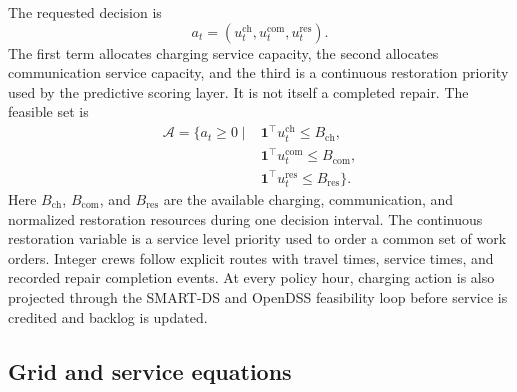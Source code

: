 \documentclass[journal]{IEEEtran}
\begin{document}
The requested decision is
\begin{equation}
a_t=(u_t^{\mathrm{ch}},u_t^{\mathrm{com}},u_t^{\mathrm{res}}).
\end{equation}
The first term allocates charging service capacity, the second allocates
communication service capacity, and the third is a continuous restoration
priority used by the predictive scoring layer.  It is not itself a completed
repair.
The feasible set is
\begin{equation}
\begin{aligned}
\mathcal{A}=\{a_t\ge0 \mid&
\mathbf{1}^{\top}u_t^{\mathrm{ch}}\le B_{\mathrm{ch}},\\
&\mathbf{1}^{\top}u_t^{\mathrm{com}}\le B_{\mathrm{com}},\\
&\mathbf{1}^{\top}u_t^{\mathrm{res}}\le B_{\mathrm{res}}\}.
\end{aligned}
\end{equation}
Here $B_{\mathrm{ch}}$, $B_{\mathrm{com}}$, and $B_{\mathrm{res}}$ are the
available charging, communication, and normalized restoration resources during
one decision interval.  The continuous restoration variable is a service level
priority used to order a common set of work orders.  Integer crews follow
explicit routes with travel times, service times, and recorded repair
completion events.  At every policy hour, charging action is also
projected through the SMART-DS and OpenDSS feasibility loop before service is
credited and backlog is updated.

\subsection{Grid and service equations}
\label{sec:service}
\end{document}
